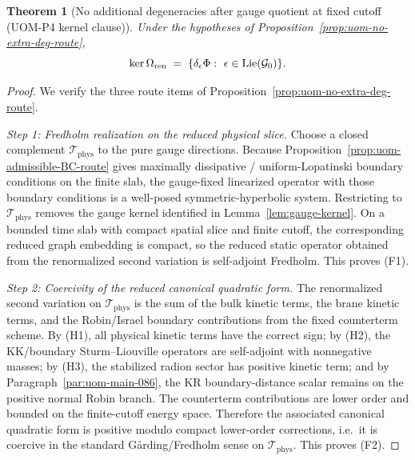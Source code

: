 \documentclass[10pt]{article}
\theoremstyle{definition}
\theoremstyle{plain}
\newtheorem{theorem}{Theorem}[section]
\begin{document}
\begin{theorem}[No additional degeneracies after gauge quotient at fixed cutoff (UOM-P4 kernel clause)]
\label{thm:uom-no-extra-deg}
Under the hypotheses of Proposition~\ref{prop:uom-no-extra-deg-route},
\[
\ker \Omega_{\rm ren}\;=\;\{\delta_\epsilon\Phi:\ \epsilon\in \mathrm{Lie}(\mathcal G_0)\}.
\]
\end{theorem}

\begin{proof}
We verify the three route items of Proposition~\ref{prop:uom-no-extra-deg-route}.

\emph{Step 1: Fredholm realization on the reduced physical slice.}
Choose a closed complement $\mathcal T_{\mathrm{phys}}$ to the pure gauge directions.  Because
Proposition~\ref{prop:uom-admissible-BC-route} gives maximally dissipative / uniform-Lopatinski boundary conditions on the finite slab,
the gauge-fixed linearized operator with those boundary conditions is a well-posed symmetric-hyperbolic system.  Restricting to
$\mathcal T_{\mathrm{phys}}$ removes the gauge kernel identified in Lemma~\ref{lem:gauge-kernel}.  On a bounded time slab with compact spatial
slice and finite cutoff, the corresponding reduced graph embedding is compact, so the reduced static operator obtained from the renormalized
second variation is self-adjoint Fredholm.  This proves \textnormal{(F1)}.

\emph{Step 2: Coercivity of the reduced canonical quadratic form.}
The renormalized second variation on $\mathcal T_{\mathrm{phys}}$ is the sum of the bulk kinetic terms, the brane kinetic terms, and the
Robin/Israel boundary contributions from the fixed counterterm scheme.  By \textnormal{(H1)}, all physical kinetic terms have the correct sign;
by \textnormal{(H2)}, the KK/boundary Sturm--Liouville operators are self-adjoint with nonnegative masses; by \textnormal{(H3)}, the stabilized
radion sector has positive kinetic term; and by Paragraph~\ref{par:uom-main-086}, the KR boundary-distance scalar remains on the positive
normal Robin branch.  The counterterm contributions are lower order and bounded on the finite-cutoff energy space.  Therefore the associated
canonical quadratic form is positive modulo compact lower-order corrections, i.e.\ it is coercive in the standard G{\aa}rding/Fredholm sense
on $\mathcal T_{\mathrm{phys}}$.  This proves \textnormal{(F2)}.


\end{proof}
\end{document}
